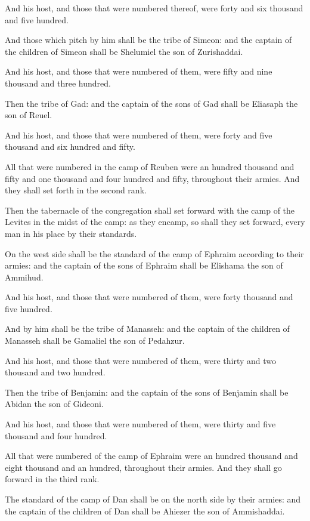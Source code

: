 \Verse And his host, and those that were numbered thereof, were forty
and six thousand and five hundred.

\Verse And those which pitch by him shall be the tribe of Simeon: and
the captain of the children of Simeon shall be Shelumiel the son of
Zurishaddai.

\Verse And his host, and those that were numbered of them, were fifty
and nine thousand and three hundred.

\Verse Then the tribe of Gad: and the captain of the sons of Gad shall
be Eliasaph the son of Reuel.

\Verse And his host, and those that were numbered of them, were forty
and five thousand and six hundred and fifty.

\Verse All that were numbered in the camp of Reuben were an hundred
thousand and fifty and one thousand and four hundred and fifty,
throughout their armies. And they shall set forth in the second rank.

\Verse Then the tabernacle of the congregation shall set forward with
the camp of the Levites in the midst of the camp: as they encamp, so
shall they set forward, every man in his place by their standards.

\Verse On the west side shall be the standard of the camp of Ephraim
according to their armies: and the captain of the sons of Ephraim
shall be Elishama the son of Ammihud.

\Verse And his host, and those that were numbered of them, were forty
thousand and five hundred.

\Verse And by him shall be the tribe of Manasseh: and the captain of the
children of Manasseh shall be Gamaliel the son of Pedahzur.

\Verse And his host, and those that were numbered of them, were thirty
and two thousand and two hundred.

\Verse Then the tribe of Benjamin: and the captain of the sons of
Benjamin shall be Abidan the son of Gideoni.

\Verse And his host, and those that were numbered of them, were thirty
and five thousand and four hundred.

\Verse All that were numbered of the camp of Ephraim were an hundred
thousand and eight thousand and an hundred, throughout their armies.
And they shall go forward in the third rank.

\Verse The standard of the camp of Dan shall be on the north side by
their armies: and the captain of the children of Dan shall be Ahiezer
the son of Ammishaddai.

